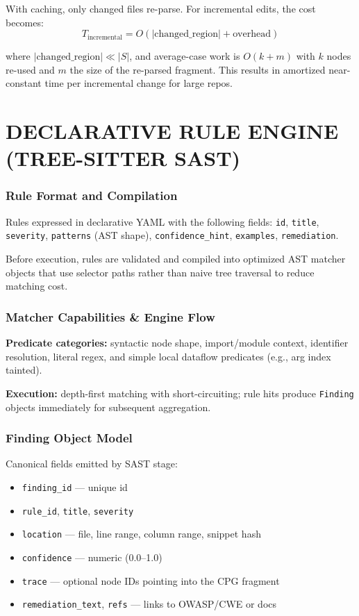 With caching, only changed files re-parse. For incremental edits, the cost becomes:
\begin{equation}
T_{\text{incremental}} = O(|\text{changed\_region}| + \text{overhead})
\label{eq:incremental_parse}
\end{equation}

where $|\text{changed\_region}| \ll |S|$, and average-case work is $O(k + m)$ with $k$ nodes re-used and $m$ the size of the re-parsed fragment. This results in amortized near-constant time per incremental change for large repos.

\section{\uppercase{Declarative Rule Engine (Tree-sitter SAST)}}

\subsubsection{Rule Format and Compilation}

Rules expressed in declarative YAML with the following fields:
\texttt{id}, \texttt{title}, \texttt{severity}, \texttt{patterns} (AST shape), \texttt{confidence\_hint}, \texttt{examples}, \texttt{remediation}.

Before execution, rules are validated and compiled into optimized AST matcher objects that use selector paths rather than naive tree traversal to reduce matching cost.

\subsubsection{Matcher Capabilities \& Engine Flow}

\textbf{Predicate categories:} syntactic node shape, import/module context, identifier resolution, literal regex, and simple local dataflow predicates (e.g., arg index tainted).

\textbf{Execution:} depth-first matching with short-circuiting; rule hits produce \texttt{Finding} objects immediately for subsequent aggregation.

\subsubsection{Finding Object Model}

Canonical fields emitted by SAST stage:

\begin{itemize}
    \item \texttt{finding\_id} --- unique id
    \item \texttt{rule\_id}, \texttt{title}, \texttt{severity}
    \item \texttt{location} --- file, line range, column range, snippet hash
    \item \texttt{confidence} --- numeric (0.0--1.0)
    \item \texttt{trace} --- optional node IDs pointing into the CPG fragment
    \item \texttt{remediation\_text}, \texttt{refs} --- links to OWASP/CWE or docs
\end{itemize}

